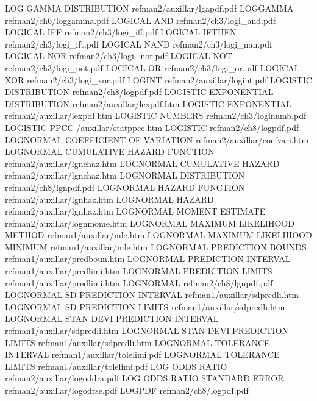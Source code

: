 LOG GAMMA DISTRIBUTION                  refman2/auxillar/lgapdf.pdf
LOGGAMMA                                refman2/ch6/loggamma.pdf
LOGICAL AND                             refman2/ch3/logi_and.pdf
LOGICAL IFF                             refman2/ch3/logi_iff.pdf
LOGICAL IFTHEN                          refman2/ch3/logi_ift.pdf
LOGICAL NAND                            refman2/ch3/logi_nan.pdf
LOGICAL NOR                             refman2/ch3/logi_nor.pdf
LOGICAL NOT                             refman2/ch3/logi_not.pdf
LOGICAL OR                              refman2/ch3/logi_or.pdf
LOGICAL XOR                             refman2/ch3/logi_xor.pdf
LOGINT                                  refman2/auxillar/logint.pdf
LOGISTIC DISTRIBUTION                   refman2/ch8/logpdf.pdf
LOGISTIC EXPONENTIAL DISTRIBUTION       refman2/auxillar/lexpdf.htm
LOGISTIC EXPONENTIAL                    refman2/auxillar/lexpdf.htm
LOGISTIC NUMBERS                        refman2/ch3/loginumb.pdf
LOGISTIC PPCC                           /auxillar/statppcc.htm
LOGISTIC                                refman2/ch8/logpdf.pdf
LOGNORMAL COEFFICIENT OF VARIATION      refman2/auxillar/coefvari.htm
LOGNORMAL CUMULATIVE HAZARD FUNCTION    refman2/auxillar/lgnchaz.htm
LOGNORMAL CUMULATIVE HAZARD             refman2/auxillar/lgnchaz.htm
LOGNORMAL DISTRIBUTION                  refman2/ch8/lgnpdf.pdf
LOGNORMAL HAZARD FUNCTION               refman2/auxillar/lgnhaz.htm
LOGNORMAL HAZARD                        refman2/auxillar/lgnhaz.htm
LOGNORMAL MOMENT ESTIMATE               refman2/auxillar/lognmome.htm
LOGNORMAL MAXIMUM LIKELIHOOD METHOD     refman1/auxillar/mle.htm
LOGNORMAL MAXIMUM LIKELIHOOD MINIMUM    refman1/auxillar/mle.htm
LOGNORMAL PREDICTION BOUNDS             refman1/auxillar/predboun.htm
LOGNORMAL PREDICTION INTERVAL           refman1/auxillar/predlimi.htm
LOGNORMAL PREDICTION LIMITS             refman1/auxillar/predlimi.htm
LOGNORMAL                               refman2/ch8/lgnpdf.pdf
LOGNORMAL SD PREDICTION INTERVAL        refman1/auxillar/sdpredli.htm
LOGNORMAL SD PREDICTION LIMITS          refman1/auxillar/sdpredli.htm
LOGNORMAL STAN DEVI PREDICTION INTERVAL refman1/auxillar/sdpredli.htm
LOGNORMAL STAN DEVI PREDICTION LIMITS   refman1/auxillar/sdpredli.htm
LOGNORMAL TOLERANCE INTERVAL            refman1/auxillar/tolelimi.pdf
LOGNORMAL TOLERANCE LIMITS              refman1/auxillar/tolelimi.pdf
LOG ODDS RATIO                          refman2/auxillar/logoddra.pdf
LOG ODDS RATIO STANDARD ERROR           refman2/auxillar/logodrse.pdf
LOGPDF                                  refman2/ch8/logpdf.pdf
